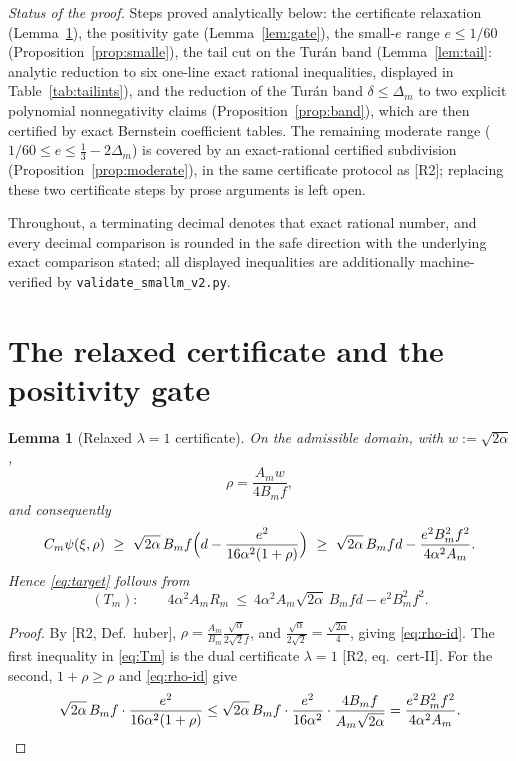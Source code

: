 \documentclass[11pt]{amsart}
\newtheorem{lemma}[theorem]{Lemma}
\begin{document}
\emph{Status of the proof.}  Steps proved analytically below: the certificate
relaxation (Lemma~\ref{lem:relax}), the positivity gate
(Lemma~\ref{lem:gate}), the small-$e$ range $e\le1/60$
(Proposition~\ref{prop:smalle}), the tail cut on the Tur\'an band
(Lemma~\ref{lem:tail}: analytic reduction to six one-line exact rational
inequalities, displayed in Table~\ref{tab:tailints}), and the reduction of
the Tur\'an band $\delta\le\Delta_m$ to two explicit polynomial
nonnegativity claims (Proposition~\ref{prop:band}), which are then certified
by exact Bernstein coefficient tables.  The remaining moderate range
($1/60\le e\le\tfrac13-2\Delta_m$) is covered by an exact-rational certified
subdivision (Proposition~\ref{prop:moderate}), in the same certificate
protocol as [R2]; replacing these two certificate steps by prose arguments
is left open.

Throughout, a terminating decimal denotes that exact rational number, and
every decimal comparison is rounded in the safe direction with the
underlying exact comparison stated; all displayed inequalities are
additionally machine-verified by \texttt{validate\_smallm\_v2.py}.

\section{The relaxed certificate and the positivity gate}

\begin{lemma}[Relaxed $\lambda=1$ certificate]\label{lem:relax}
On the admissible domain, with $w:=\sqrt{2\alpha}$,
\begin{equation}\label{eq:rho-id}
 \rho=\frac{A_m w}{4B_m f},
\end{equation}
and consequently
\begin{equation}\label{eq:Tm}
 C_m\psi(\xi,\rho)\ \ge\ \sqrt{2\alpha}\,B_mf\Bigl(d-\frac{e^2}{16\alpha^2(1+\rho)}\Bigr)
 \ \ge\ \sqrt{2\alpha}\,B_mfd-\frac{e^2B_m^2f^2}{4\alpha^2A_m}.
\end{equation}
Hence \eqref{eq:target} follows from
\begin{equation}\label{eq:Tm2}
 (T_m):\qquad 4\alpha^2A_m R_m\ \le\ 4\alpha^2 A_m\sqrt{2\alpha}\,B_mfd-e^2B_m^2f^2 .
\end{equation}
\end{lemma}

\begin{proof}
By [R2, Def.~huber], $\rho=\frac{A_m}{B_m}\frac{\sqrt\alpha}{2\sqrt2 f}$, and
$\frac{\sqrt\alpha}{2\sqrt2}=\frac{\sqrt{2\alpha}}4$, giving \eqref{eq:rho-id}.
The first inequality in \eqref{eq:Tm} is the dual certificate $\lambda=1$
[R2, eq.~cert-II].  For the second, $1+\rho\ge\rho$ and \eqref{eq:rho-id} give
\[
 \sqrt{2\alpha}\,B_mf\cdot\frac{e^2}{16\alpha^2(1+\rho)}
 \le \sqrt{2\alpha}\,B_mf\cdot\frac{e^2}{16\alpha^2}\cdot\frac{4B_mf}{A_m\sqrt{2\alpha}}
 =\frac{e^2B_m^2f^2}{4\alpha^2A_m}. \qedhere
\]
\end{proof}
\end{document}
